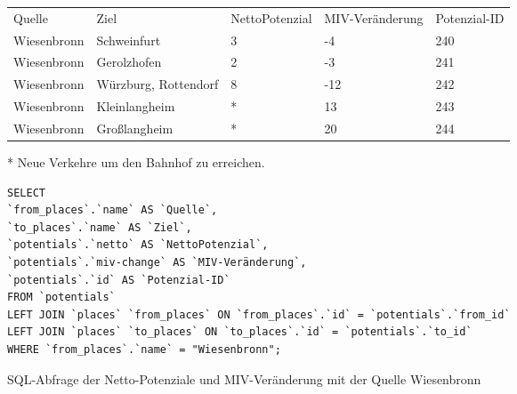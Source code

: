 \begin{tabular}{ l  l  l  l  l }
Quelle & Ziel & NettoPotenzial & MIV-Veränderung & Potenzial-ID\\ 
Wiesenbronn & Schweinfurt & 3 & -4 & 240\\ 
Wiesenbronn & Gerolzhofen & 2 & -3 & 241\\ 
Wiesenbronn & Würzburg, Rottendorf & 8 & -12 & 242\\ 
Wiesenbronn & Kleinlangheim & * & 13 & 243\\ 
Wiesenbronn & Großlangheim & * & 20 & 244\\ 
\end{tabular}
\newline
\newline
* Neue Verkehre um den Bahnhof zu erreichen.
\newline
\begin{listing}[htbp]
\begin{verbatim}
SELECT
`from_places`.`name` AS `Quelle`, 
`to_places`.`name` AS `Ziel`, 
`potentials`.`netto` AS `NettoPotenzial`, 
`potentials`.`miv-change` AS `MIV-Veränderung`, 
`potentials`.`id` AS `Potenzial-ID`
FROM `potentials`
LEFT JOIN `places` `from_places` ON `from_places`.`id` = `potentials`.`from_id`
LEFT JOIN `places` `to_places` ON `to_places`.`id` = `potentials`.`to_id`
WHERE `from_places`.`name` = "Wiesenbronn";
\end{verbatim}
\caption{SQL-Abfrage der Netto-Potenziale und MIV-Veränderung mit der Quelle Wiesenbronn}\label{lst-fz-wiesenbronn}
\end{listing}